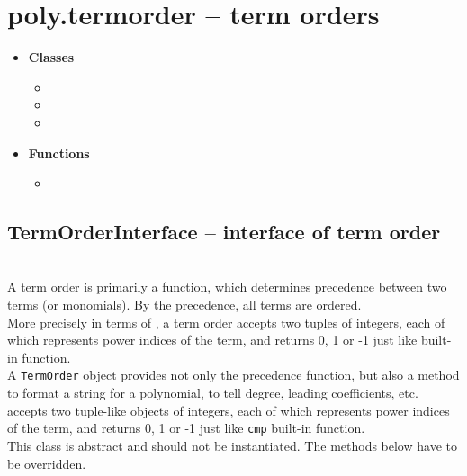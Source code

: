 

 \section{poly.termorder -- term orders}
 \begin{itemize}
   \item {\bf Classes}
     \begin{itemize}
     \item \negok {}
     \item \negok {}
     \item {}
     \end{itemize}
   \item {\bf Functions}
     \begin{itemize}
       \item {}
     \end{itemize}
 \end{itemize}

\C

 \subsection{TermOrderInterface -- interface of term order}
 \initialize
  \\
  \spacing
  \quad A term order is primarily a function, which determines
  precedence between two terms (or monomials). By the precedence, all
  terms are ordered.\\
  \quad More precisely in terms of \python, a term order accepts two
  tuples of integers, each of which represents power indices of the
  term, and returns 0, 1 or -1 just like 
  built-in function.\\
  \quad A {\tt TermOrder} object provides not only the precedence function,
  but also a method to format a string for a polynomial, to tell
  degree, leading coefficients, etc.\\
  \spacing
  \quad {} accepts two tuple-like objects of integers,
  each of which represents power indices of the term, and returns 0, 1
  or -1 just like {\tt cmp} built-in function.\\
  \spacing
  This class is abstract and should not be instantiated.
  The methods below have to be overridden.
  \method
